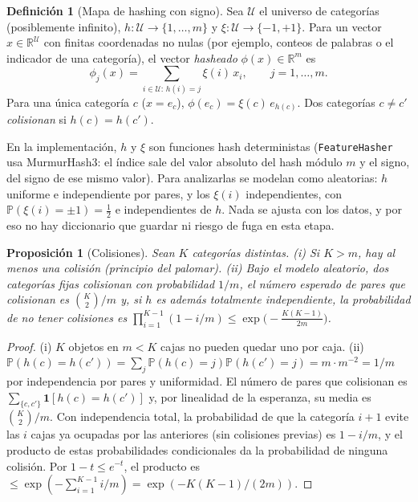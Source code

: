 \documentclass[11pt]{article}
\newtheorem{proposicion}[teorema]{Proposición}
\theoremstyle{definition}
\newtheorem{definicion}[teorema]{Definición}
\theoremstyle{remark}
\newcommand{\R}{\mathbb{R}}
\newcommand{\Prob}{\mathbb{P}}
\newcommand{\ind}[1]{\mathbf{1}\!\left[#1\right]}
\begin{document}
\begin{definicion}[Mapa de hashing con signo]\label{def:hash}
\noindent Sea $\mathcal{U}$ el universo de categorías (posiblemente infinito), $h:\mathcal{U}\to\{1,\dots,m\}$ y $\xi:\mathcal{U}\to\{-1,+1\}$. Para un vector $x\in\R^{\mathcal U}$ con finitas coordenadas no nulas (por ejemplo, conteos de palabras o el indicador de una categoría), el vector \emph{hasheado} $\phi(x)\in\R^m$ es
\[
\phi_j(x)=\sum_{i\in\mathcal{U}:\,h(i)=j}\xi(i)\,x_i,\qquad j=1,\dots,m.
\]
Para una única categoría $c$ ($x=e_c$), $\phi(e_c)=\xi(c)\,e_{h(c)}$. Dos categorías $c\ne c'$ \emph{colisionan} si $h(c)=h(c')$.
\end{definicion}

\noindent En la implementación, $h$ y $\xi$ son funciones hash deterministas (\texttt{FeatureHasher} usa MurmurHash3: el índice sale del valor absoluto del hash módulo $m$ y el signo, del signo de ese mismo valor). Para analizarlas se modelan como aleatorias: $h$ uniforme e independiente por pares, y los $\xi(i)$ independientes, con $\Prob(\xi(i)=\pm1)=\frac12$ e independientes de $h$. Nada se ajusta con los datos, y por eso no hay diccionario que guardar ni riesgo de fuga en esta etapa.

\begin{proposicion}[Colisiones]\label{prop:colisiones}
\noindent Sean $K$ categorías distintas. (i) Si $K>m$, hay al menos una colisión (principio del palomar). (ii) Bajo el modelo aleatorio, dos categorías fijas colisionan con probabilidad $1/m$, el número esperado de pares que colisionan es $\binom K2/m$ y, si $h$ es además totalmente independiente, la probabilidad de no tener colisiones es $\prod_{i=1}^{K-1}(1-i/m)\le\exp\!\big(-\tfrac{K(K-1)}{2m}\big)$.
\end{proposicion}
\begin{proof}
\noindent (i) $K$ objetos en $m<K$ cajas no pueden quedar uno por caja. (ii) $\Prob(h(c)=h(c'))=\sum_j\Prob(h(c)=j)\Prob(h(c')=j)=m\cdot m^{-2}=1/m$ por independencia por pares y uniformidad. El número de pares que colisionan es $\sum_{\{c,c'\}}\ind{h(c)=h(c')}$ y, por linealidad de la esperanza, su media es $\binom K2/m$. Con independencia total, la probabilidad de que la categoría $i+1$ evite las $i$ cajas ya ocupadas por las anteriores (sin colisiones previas) es $1-i/m$, y el producto de estas probabilidades condicionales da la probabilidad de ninguna colisión. Por $1-t\le e^{-t}$, el producto es $\le\exp(-\sum_{i=1}^{K-1}i/m)=\exp(-K(K-1)/(2m))$.
\end{proof}
\end{document}
